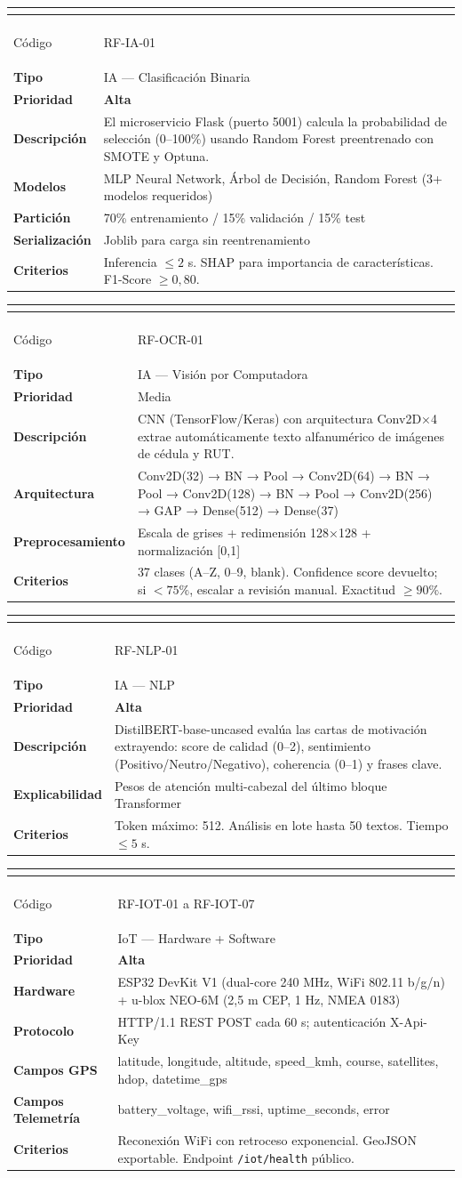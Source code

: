 \documentclass[12pt,a4paper,twoside]{report}
\newenvironment{reqenv}[2]{%
  \begin{longtable}{|>{\columncolor{rowGray}\bfseries\small}p{3.8cm}|>{\small}p{10.5cm}|}
  \hline
  \multicolumn{2}{|>{\columncolor{tableHdr}}c|}{\textcolor{white}{\textbf{#1 — #2}}} \\
  \hline \endfirsthead
  \hline
  \multicolumn{2}{|>{\columncolor{tableHdr}}c|}{\textcolor{white}{\textbf{#1 — #2 (Cont.)}}} \\
  \hline \endhead \hline
}{%
  \end{longtable}
}
\newcommand{\reqrow}[2]{#1 & #2 \\[2pt] \hline}
\begin{document}
\begin{reqenv}{RF-IA-01}{Predicción ML con Ensamble de Modelos}
\reqrow{Código}{RF-IA-01}
\reqrow{Tipo}{IA — Clasificación Binaria}
\reqrow{Prioridad}{\textcolor{uscoRed}{\textbf{Alta}}}
\reqrow{Descripción}{El microservicio Flask (puerto 5001) calcula la probabilidad de selección (0--100\%) usando Random Forest preentrenado con SMOTE y Optuna.}
\reqrow{Modelos}{MLP Neural Network, Árbol de Decisión, Random Forest (3+ modelos requeridos)}
\reqrow{Partición}{70\% entrenamiento / 15\% validación / 15\% test}
\reqrow{Serialización}{Joblib para carga sin reentrenamiento}
\reqrow{Criterios}{Inferencia $\leq 2$ s. SHAP para importancia de características. F1-Score $\geq 0{,}80$.}
\end{reqenv}

\begin{reqenv}{RF-OCR-01}{Visión por Computadora — CNN OCR}
\reqrow{Código}{RF-OCR-01}
\reqrow{Tipo}{IA — Visión por Computadora}
\reqrow{Prioridad}{Media}
\reqrow{Descripción}{CNN (TensorFlow/Keras) con arquitectura Conv2D×4 extrae automáticamente texto alfanumérico de imágenes de cédula y RUT.}
\reqrow{Arquitectura}{Conv2D(32) → BN → Pool → Conv2D(64) → BN → Pool → Conv2D(128) → BN → Pool → Conv2D(256) → GAP → Dense(512) → Dense(37)}
\reqrow{Preprocesamiento}{Escala de grises + redimensión 128×128 + normalización [0,1]}
\reqrow{Criterios}{37 clases (A--Z, 0--9, blank). Confidence score devuelto; si $< 75\%$, escalar a revisión manual. Exactitud $\geq 90\%$.}
\end{reqenv}

\begin{reqenv}{RF-NLP-01}{Transformer NLP — Análisis de Cartas}
\reqrow{Código}{RF-NLP-01}
\reqrow{Tipo}{IA — NLP}
\reqrow{Prioridad}{\textcolor{uscoRed}{\textbf{Alta}}}
\reqrow{Descripción}{DistilBERT-base-uncased evalúa las cartas de motivación extrayendo: score de calidad (0--2), sentimiento (Positivo/Neutro/Negativo), coherencia (0--1) y frases clave.}
\reqrow{Explicabilidad}{Pesos de atención multi-cabezal del último bloque Transformer}
\reqrow{Criterios}{Token máximo: 512. Análisis en lote hasta 50 textos. Tiempo $\leq 5$ s.}
\end{reqenv}

\begin{reqenv}{RF-IOT-01}{Telemetría GPS con ESP32 + NEO-6M}
\reqrow{Código}{RF-IOT-01 a RF-IOT-07}
\reqrow{Tipo}{IoT — Hardware + Software}
\reqrow{Prioridad}{\textcolor{uscoRed}{\textbf{Alta}}}
\reqrow{Hardware}{ESP32 DevKit V1 (dual-core 240 MHz, WiFi 802.11 b/g/n) + u-blox NEO-6M (2,5 m CEP, 1 Hz, NMEA 0183)}
\reqrow{Protocolo}{HTTP/1.1 REST POST cada 60 s; autenticación X-Api-Key}
\reqrow{Campos GPS}{latitude, longitude, altitude, speed\_kmh, course, satellites, hdop, datetime\_gps}
\reqrow{Campos Telemetría}{battery\_voltage, wifi\_rssi, uptime\_seconds, error}
\reqrow{Criterios}{Reconexión WiFi con retroceso exponencial. GeoJSON exportable. Endpoint \texttt{/iot/health} público.}
\end{reqenv}
\end{document}

